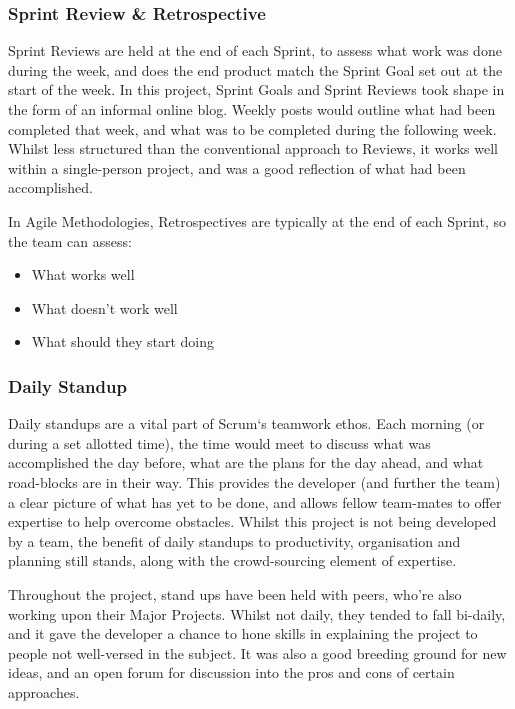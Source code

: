 \subsubsection{Sprint Review \& Retrospective}

Sprint Reviews are held at the end of each Sprint, to assess what work was done during the week, and does the end product match the Sprint Goal set out at the start of the week. In this project, Sprint Goals and Sprint Reviews took shape in the form of an informal online blog. Weekly posts would outline what had been completed that week, and what was to be completed during the following week. Whilst less structured than the conventional approach to Reviews, it works well within a single-person project, and was a good reflection of what had been accomplished.

In Agile Methodologies, Retrospectives are typically at the end of each Sprint, so the team can assess:
\begin{itemize}
  \item What works well
  \item What doesn't work well
  \item What should they start doing
\end{itemize}

\subsubsection{Daily Standup}

Daily standups are a vital part of Scrum`s teamwork ethos. Each morning (or during a set allotted time), the time would meet to discuss what was accomplished the day before, what are the plans for the day ahead, and what road-blocks are in their way. This provides the developer (and further the team) a clear picture of what has yet to be done, and allows fellow team-mates to offer expertise to help overcome obstacles. Whilst this project is not being developed by a team, the benefit of daily standups to productivity, organisation and planning still stands, along with the crowd-sourcing element of expertise.

Throughout the project, stand ups have been held with peers, who're also working upon their Major Projects. Whilst not daily, they tended to fall bi-daily, and it gave the developer a chance to hone skills in explaining the project to people not well-versed in the subject. It was also a good breeding ground for new ideas, and an open forum for discussion into the pros and cons of certain approaches.


